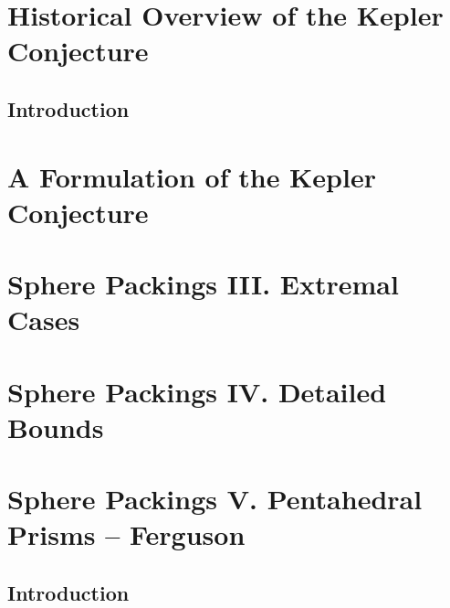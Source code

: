 \documentclass[onecolumn]{newsiambook}
\def\shortversion#1{#1}
\def\longversion#1{}
\def\shortversion#1{}
\def\longversion#1{#1}
\begin{document}
\mainmatter



\longversion{
   \part{Historical Overview of the Kepler Conjecture}
   \label{part:intro}
   \chapter{Introduction}
   
   \label{sec:intro-review}
   
    }


\longversion{
    \part{A Formulation of the Kepler Conjecture}
    
    }
    \label{part:form}
    


\longversion{
    \part{Sphere Packings III. Extremal Cases}
    \label{part:iii}
    
    
    
    }
\shortversion{}


\longversion{
    \part{Sphere Packings IV. Detailed Bounds}
    \label{part:bounds}
    
    
    }


\longversion{
    \part{Sphere Packings V. Pentahedral Prisms -- Ferguson}
    \label{part:ferguson}
    \chapter*{Introduction}
    
    
    }
\end{document}
